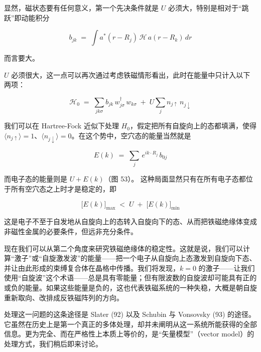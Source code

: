 显然，磁状态要有任何意义，第一个先决条件就是 $U$ 必须大，特别是相对于“跳跃”即动能积分

\begin{equation*}
b_{jk} \;=\; \int a^{*}(r-R_j)\, \mathcal{H}\, a(r-R_k)\, dr
\end{equation*}

而言要大。

$U$ 必须很大，这一点可以再次通过考虑铁磁情形看出，此时在能量中只计入以下两项：

\begin{equation*}
\mathcal{H}_0 \;=\; \sum_{jk\sigma} b_{jk}\, w^{\dagger}_{j\sigma}\, w_{k\sigma} \;+\; U \sum_j n_{j\uparrow}\, n_{j\downarrow}
\end{equation*}

我们可以在 Hartree-Fock 近似下处理 $H_0$，假定把所有自旋向上的态都填满，使得 $\langle n_{j\uparrow}\rangle = 1$、$\langle n_{j\downarrow}\rangle = 0$。在这个势中，空穴态的能量当然就是

\begin{equation*}
E(k) \;=\; \sum_j\, e^{ik\cdot R_j}\, b_{0j}
\end{equation*}

而电子态的能量则是 $U + E(k)$（图 53）。
这种局面显然只有在所有电子态都位于所有空穴态之上时才是稳定的，即

\begin{equation*}
\bigl[E(k)\bigr]_{\max} \;<\; U \;+\; \bigl[E(k)\bigr]_{\min}
\end{equation*}

这是电子不至于自发地从自旋向上的态转入自旋向下的态、从而把铁磁绝缘体变成非磁性金属的必要条件，但远非充分条件。

现在我们可以从第二个角度来研究铁磁绝缘体的稳定性。这就是说，我们可以计算“激子”或“自旋激发波”的能量——把一个电子从自旋向上态激发到自旋向下态、并让由此形成的束缚复合体在晶格中传播。我们将发现，$k=0$ 的激子——让我们使用“自旋波”这个术语——总是具有零能量；但有限波数的自旋波却可能具有正的或负的能量。如果这些能量是负的，这也代表铁磁系统的一种失稳，大概是朝自旋重新取向、改排成反铁磁阵列的方向。

处理这一问题的这条途径是 Slater (92) 以及 Schubin 与 Vonsovsky (93) 的途径。它虽然在历史上是第一个真正的多体处理，却并未阐明从这一系统所能获得的全部信息。更为完全、而在严格性上本质上等价的，是“矢量模型”（vector model）的处理方式，我们稍后即来讨论。

